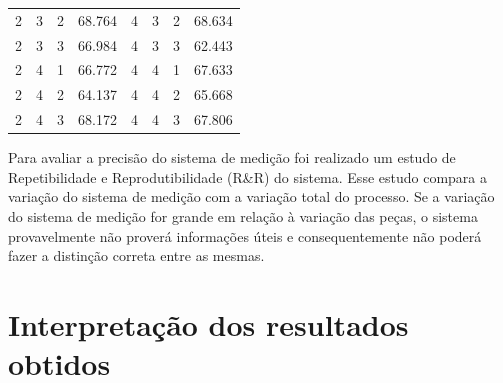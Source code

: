 \documentclass[
12pt,					%
openright,				%
oneside,				%
a4paper,				%
english,
brazil
]{ABNT/abntex2_report}
\begin{document}
\begin{table}[H]
\begin{tabular}{llllllll}
	2                           & 3                        & 2                         & 68.764   & 4                           & 3                        & 2                         & 68.634                        \\
	2                           & 3                        & 3                         & 66.984   & 4                           & 3                        & 3                         & 62.443                        \\
	2                           & 4                        & 1                         & 66.772   & 4                           & 4                        & 1                         & 67.633                        \\
	2                           & 4                        & 2                         & 64.137   & 4                           & 4                        & 2                         & 65.668                        \\
	2                           & 4                        & 3                         & 68.172   & 4                           & 4                        & 3                         & 67.806                       
	\end{tabular}
	\label{tab:dados}
	\end{table}

Para avaliar a precisão do  sistema de medição foi realizado um estudo de Repetibilidade e Reprodutibilidade (R\&R) do sistema. Esse estudo compara a variação do sistema de medição com a variação total do processo. Se a variação do sistema de medição for grande em relação à variação das peças, o sistema provavelmente não proverá informações úteis e consequentemente não poderá fazer a distinção correta entre as mesmas.
\newpage
\section*{Interpretação dos resultados obtidos}
\end{document}
